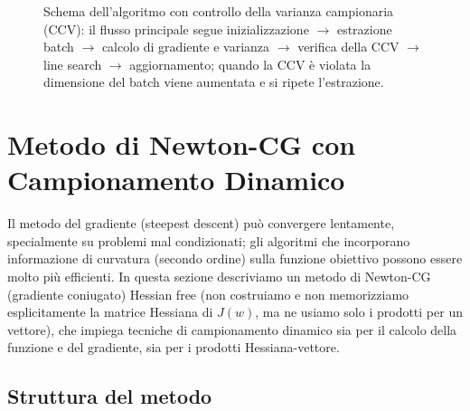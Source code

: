 \documentclass[italian, a4paper, twoside, binding=6mm]{sapthesis}
\begin{document}
\begin{figure}[h]
{}
\caption{Schema dell'algoritmo con controllo della varianza campionaria (CCV):
il flusso principale segue inizializzazione $\to$ estrazione batch $\to$
calcolo di gradiente e varianza $\to$ verifica della CCV $\to$ line search
$\to$ aggiornamento; quando la CCV \`e violata la dimensione del batch viene
aumentata e si ripete l'estrazione.}
\label{fig:block_diagram}
\end{figure}

\section{Metodo di Newton-CG con Campionamento Dinamico}

Il metodo del gradiente (steepest descent) può convergere lentamente, specialmente su problemi mal condizionati; gli algoritmi che incorporano informazione di curvatura (secondo ordine) sulla funzione obiettivo possono essere molto più efficienti. In questa sezione descriviamo un metodo di Newton-CG (gradiente coniugato) Hessian free (non costruiamo e non memorizziamo esplicitamente la matrice Hessiana di $J(w)$, ma ne usiamo solo i prodotti per un vettore), che impiega tecniche di campionamento dinamico sia per il calcolo della funzione e del gradiente, sia per i prodotti Hessiana-vettore.

\subsection{Struttura del metodo}
\end{document}
